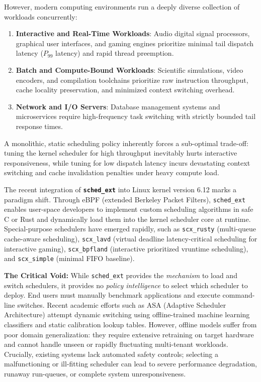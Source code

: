 \documentclass[journal]{IEEEtran}
\begin{document}
However, modern computing environments run a deeply diverse collection of workloads concurrently:
\begin{enumerate}
    \item \textbf{Interactive and Real-Time Workloads}: Audio digital signal processors, graphical user interfaces, and gaming engines prioritize minimal tail dispatch latency ($P_{99}$ latency) and rapid thread preemption.
    \item \textbf{Batch and Compute-Bound Workloads}: Scientific simulations, video encoders, and compilation toolchains prioritize raw instruction throughput, cache locality preservation, and minimized context switching overhead.
    \item \textbf{Network and I/O Servers}: Database management systems and microservices require high-frequency task switching with strictly bounded tail response times.
\end{enumerate}

A monolithic, static scheduling policy inherently forces a sub-optimal trade-off: tuning the kernel scheduler for high throughput inevitably hurts interactive responsiveness, while tuning for low dispatch latency incurs devastating context switching and cache invalidation penalties under heavy compute load.

The recent integration of \textbf{\texttt{sched\_ext}} into Linux kernel version 6.12 marks a paradigm shift. Through eBPF (extended Berkeley Packet Filters), \texttt{sched\_ext} enables user-space developers to implement custom scheduling algorithms in safe C or Rust and dynamically load them into the kernel scheduler core at runtime. Special-purpose schedulers have emerged rapidly, such as \texttt{scx\_rusty} (multi-queue cache-aware scheduling), \texttt{scx\_lavd} (virtual deadline latency-critical scheduling for interactive gaming), \texttt{scx\_bpfland} (interactive prioritized vruntime scheduling), and \texttt{scx\_simple} (minimal FIFO baseline).

\textbf{The Critical Void:} While \texttt{sched\_ext} provides the \textit{mechanism} to load and switch schedulers, it provides no \textit{policy intelligence} to select which scheduler to deploy. End users must manually benchmark applications and execute command-line switches. Recent academic efforts such as ASA (Adaptive Scheduler Architecture) attempt dynamic switching using offline-trained machine learning classifiers and static calibration lookup tables. However, offline models suffer from poor domain generalization: they require extensive retraining on target hardware and cannot handle unseen or rapidly fluctuating multi-tenant workloads. Crucially, existing systems lack automated safety controls; selecting a malfunctioning or ill-fitting scheduler can lead to severe performance degradation, runaway run-queues, or complete system unresponsiveness.
\end{document}
